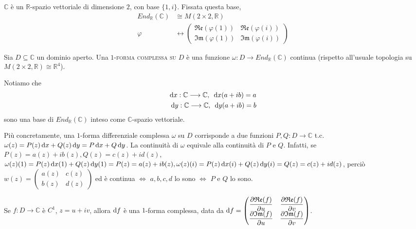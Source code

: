 $\mathbb{C}$ è un $\mathbb{R}$-spazio vettoriale di dimensione $2$, con base $\{1, i\}$. Fissata questa base,
\begin{align*}
  End_{\mathbb{R}}(\mathbb{C}) &\cong M(2 \times 2, \mathbb{R})\\
  \varphi &\longleftrightarrow \begin{pmatrix}
    \mathfrak{Re}(\varphi(1)) & \mathfrak{Re}(\varphi(i))\\
    \mathfrak{Im}(\varphi(1)) & \mathfrak{Im}(\varphi(i))
\end{pmatrix}
\end{align*}

\begin{defn}
  Sia $D \subseteq \mathbb{C}$ un dominio aperto. Una \textsc{$1$-forma complessa su $D$} è una funzione $\omega:D \longrightarrow End_{\mathbb{R}}(\mathbb{C})$ continua (rispetto all'usuale topologia su $M(2 \times 2, \mathbb{R}) \cong \mathbb{R}^4$).
\end{defn}

Notiamo che
\begin{align*}
  \mathop{}\!\mathrm{d} x: \mathbb{C} \longrightarrow \mathbb{C}, \,\,\, \mathop{}\!\mathrm{d} x(a+ib)=a\\
  \mathop{}\!\mathrm{d} y: \mathbb{C} \longrightarrow \mathbb{C}, \,\,\, \mathop{}\!\mathrm{d} y(a+ib)=b
\end{align*}
sono una base di $End_{\mathbb{R}}(\mathbb{C})$ inteso come $\mathbb{C}$-spazio vettoriale.

Più concretamente, una $1$-forma differenziale complessa $\omega$ su $D$ corrisponde a due funzioni $P, Q:D \longrightarrow \mathbb{C}$ t.c. $\omega(z)=P(z)\mathop{}\!\mathrm{d} x+Q(z)\mathop{}\!\mathrm{d} y=P\mathop{}\!\mathrm{d} x+Q\mathop{}\!\mathrm{d} y$. La continuità di $\omega$ equivale alla continuità di $P$ e $Q$. Infatti, se $P(z)=a(z)+ib(z), Q(z)=c(z)+id(z)$, $\omega(z)(1)=P(z)\mathop{}\!\mathrm{d} x(1)+Q(z)\mathop{}\!\mathrm{d} y(1)=P(z)=a(z)+ib(z), \omega(z)(i)=P(z)\mathop{}\!\mathrm{d} x(i)+Q(z)\mathop{}\!\mathrm{d} y(i)=Q(z)=c(z)+id(z)$, perciò $w(z)=\begin{pmatrix}
  a(z) & c(z)\\
  b(z) & d(z)
\end{pmatrix}$ ed è continua $\iff$ $a, b, c, d$ lo sono $\iff$ $P$ e $Q$ lo sono.

\begin{ex}
  Se $f:D \longrightarrow \mathbb{C}$ è $C^1$, $z=u+iv$, allora $\mathop{}\!\mathrm{d} f$ è una $1$-forma complessa, data da $\mathop{}\!\mathrm{d} f=\begin{pmatrix}
    \dfrac{\partial\mathfrak{Re}(f)}{\partial u} & \dfrac{\partial\mathfrak{Re}(f)}{\partial v}\\
    \dfrac{\partial\mathfrak{Im}(f)}{\partial u} & \dfrac{\partial\mathfrak{Im}(f)}{\partial v}
\end{pmatrix}$.
\end{ex}

